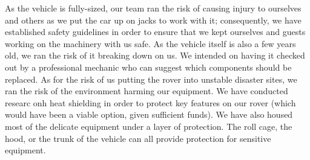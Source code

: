 As the vehicle is fully-sized, our team ran the risk of causing injury to ourselves and others as we put the car up on jacks to work with it; consequently, we have established safety guidelines in order to ensure that we kept ourselves and guests working on the machinery with us safe. As the vehicle itself is also a few years old, we ran the risk of it breaking down on us. We intended on having it checked out by a professional mechanic who can suggest which components should be replaced. As for the risk of us putting the rover into unstable disaster sites, we ran the risk of the environment harming our equipment. We have conducted researc onh heat shielding in order to protect key features on our rover (which would have been a viable option, given sufficient funds). We have also housed most of the delicate equipment under a layer of protection. The roll cage, the hood, or the trunk of the vehicle can all provide protection for sensitive equipment. 


